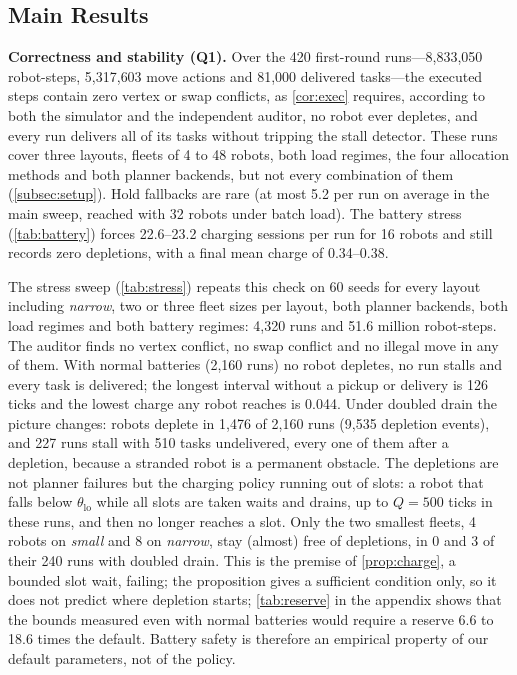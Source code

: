 \subsection{Main Results}\label{subsec:main}


\noindent\textbf{Correctness and stability (Q1).}
Over the 420 first-round runs---8{,}833{,}050 robot-steps, 5{,}317{,}603
move actions and 81{,}000 delivered tasks---the executed steps contain zero
vertex or swap conflicts, as \cref{cor:exec} requires, according to both the
simulator and the independent auditor, no robot ever depletes, and every run
delivers all of its tasks without tripping the stall detector. These runs
cover three layouts, fleets of 4 to 48 robots, both load regimes, the four
allocation methods and both planner backends, but not every combination of
them (\cref{subsec:setup}). Hold fallbacks are rare (at most 5.2 per run on average in the
main sweep, reached with 32 robots under batch load). The battery stress
(\cref{tab:battery}) forces 22.6--23.2 charging sessions per run for 16
robots and still records zero depletions, with a final mean charge of
0.34--0.38.


The stress sweep (\cref{tab:stress}) repeats this check on 60 seeds for every
layout including \emph{narrow}, two or three fleet sizes per layout, both
planner backends, both load regimes and both battery regimes: 4{,}320 runs
and 51.6 million robot-steps. The auditor finds no vertex conflict, no swap
conflict and no illegal move in any of them. With normal batteries (2{,}160
runs) no robot depletes, no run stalls and every task is delivered; the
longest interval without a pickup or delivery is 126 ticks and the lowest
charge any robot reaches is 0.044. Under doubled drain the picture changes:
robots deplete in 1{,}476 of 2{,}160 runs (9{,}535 depletion events), and
227 runs stall with 510 tasks undelivered, every one of them after a
depletion, because a stranded robot is a permanent obstacle. The depletions
are not planner failures but the charging policy running out of slots: a
robot that falls below $\theta_{\mathrm{lo}}$ while all slots are taken
waits and drains, up to $Q=500$ ticks in these runs, and then no longer
reaches a slot. Only the two smallest fleets, 4 robots on \emph{small} and 8
on \emph{narrow}, stay (almost) free of depletions, in 0 and 3 of their 240
runs with doubled drain. This is the
premise of \cref{prop:charge}, a bounded slot wait, failing; the
proposition gives a sufficient condition only, so it does not predict
where depletion starts; \cref{tab:reserve} in the appendix shows that the bounds measured even
with normal batteries would require a reserve 6.6 to 18.6 times the default.
Battery safety is therefore an empirical property of our default parameters,
not of the policy.

